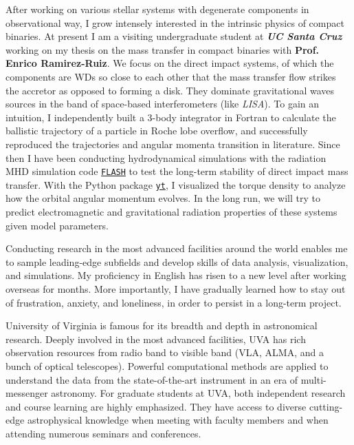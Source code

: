 \documentclass[12pt, a4paper]{awesome-cv} %
\begin{document}
\begin{cvletter}
After working on various stellar systems with degenerate components in observational way, I grow intensely interested in the intrinsic physics of compact binaries. At present I am a visiting undergraduate student at \textbf{\textit{UC Santa Cruz}} working on my thesis on the mass transfer in compact binaries with \textbf{Prof. Enrico Ramirez-Ruiz}. We focus on the direct impact systems, of which the components are WDs so close to each other that the mass transfer flow strikes the accretor as opposed to forming a disk. They dominate gravitational waves sources in the band of space-based interferometers (like \textit{LISA}). To gain an intuition, I independently built a 3-body integrator in Fortran to calculate the ballistic trajectory of a particle in Roche lobe overflow, and successfully reproduced the trajectories and angular momenta transition in literature. Since then I have been conducting hydrodynamical simulations with the radiation MHD simulation code \href{http://flash.uchicago.edu/site/}{\texttt{FLASH}} to test the long-term stability of direct impact mass transfer. With the Python package \href{https://yt-project.org}{\texttt{yt}}, I visualized the torque density to analyze how the orbital angular momentum evolves. In the long run, we will try to predict electromagnetic and gravitational radiation properties of these systems given model parameters.

Conducting research in the most advanced facilities around the world enables me to sample leading-edge subfields and develop skills of data analysis, visualization, and simulations. My proficiency in English has risen to a new level after working overseas for months. More importantly, I have gradually learned how to stay out of frustration, anxiety, and loneliness, in order to persist in a long-term project.


University of Virginia is famous for its breadth and depth in astronomical research. Deeply involved in the most advanced facilities, UVA has rich observation resources from radio band to visible band (VLA, ALMA, and a bunch of optical telescopes). Powerful computational methods are applied to understand the data from the state-of-the-art instrument in an era of multi-messenger astronomy. For graduate students at UVA, both independent research and course learning are highly emphasized. They have access to diverse cutting-edge astrophysical knowledge when meeting with faculty members and when attending numerous seminars and conferences. 


\end{cvletter}
\end{document}
